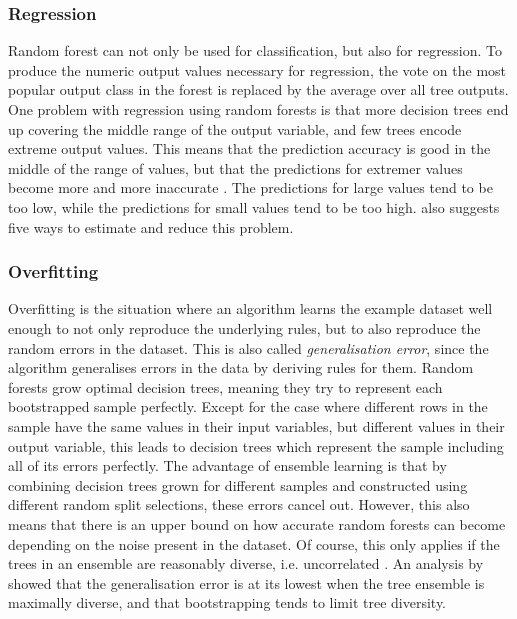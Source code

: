 \documentclass[a4paper,man,12pt,apacite,floatsintext]{apa6} %
\begin{document}
\subsubsection{Regression}
Random forest can not only be used for classification, but also for regression.
To produce the numeric output values necessary for regression,
the vote on the most popular output class in the forest is replaced by the
average over all tree outputs.
One problem with regression using random forests is that more decision trees
end up covering the middle range of the output variable,
and few trees encode extreme output values.
This means that the prediction accuracy is good in the middle of the range
of values, but that the predictions for extremer values become more and more
inaccurate \cite{zhang2012bias}.
The predictions for large values tend to be too low, while the predictions for
small values tend to be too high.
 also suggests five ways to estimate and reduce this problem.

\subsubsection{Overfitting}
Overfitting \cite{wpOF} is the situation where an algorithm learns the
example dataset well enough to not only reproduce the underlying rules,
but to also reproduce the random errors in the dataset.
This is also called \emph{generalisation error}, since the algorithm
generalises errors in the data by deriving rules for them.
Random forests grow optimal decision trees, meaning they try to represent
each bootstrapped sample perfectly.
Except for the case where different rows in the sample have the same
values in their input variables, but different values in their output variable,
this leads to decision trees which represent the sample including all of its errors perfectly.
The advantage of ensemble learning is that by combining decision trees grown
for different samples and constructed using different random split selections,
these errors cancel out.
However, this also means that there is an upper bound on how accurate
random forests can become depending on the noise present in the dataset.
Of course, this only applies if the trees in an ensemble are reasonably
diverse, i.e. uncorrelated \cite{breiman2001random}.
An analysis by  showed that the generalisation error
is at its lowest when the tree ensemble is maximally diverse,
and that bootstrapping tends to limit tree diversity.
\end{document}
